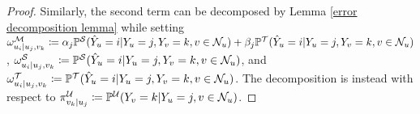 \begin{proof}

Similarly, the second term can be decomposed by Lemma  \ref{error decomposition lemma} while setting $\omega^{\mathcal{M}}_{u_i|u_j,v_k} \coloneq 
    \alpha_j 
     \mathbb{P}^\mathcal{S}(\hat{Y}_u=i| Y_u=j, Y_{v}=k, v\in \mathcal{N}_u)
    + 
    \beta_j 
     \mathbb{P}^\mathcal{T}(\hat{Y}_u=i| Y_u=j, Y_{v}=k, v\in \mathcal{N}_u)$, $\omega^{\mathcal{S}}_{u_i|u_j,v_k}\coloneq \mathbb{P}^\mathcal{S}(\hat{Y}_u=i| Y_u=j, Y_{v}=k, v\in \mathcal{N}_u)$, and $\omega^{\mathcal{T}}_{u_i|u_j,v_k}\coloneq \mathbb{P}^\mathcal{T}(\hat{Y}_u=i| Y_u=j, Y_{v}=k, v\in \mathcal{N}_u)$. 
The decomposition is instead with respect to $\pi^{\mathcal{U}}_{v_k|u_j} \coloneq \mathbb{P}^\mathcal{U}(Y_{v}=k | Y_u=j, v\in \mathcal{N}_u )$.


\end{proof}
